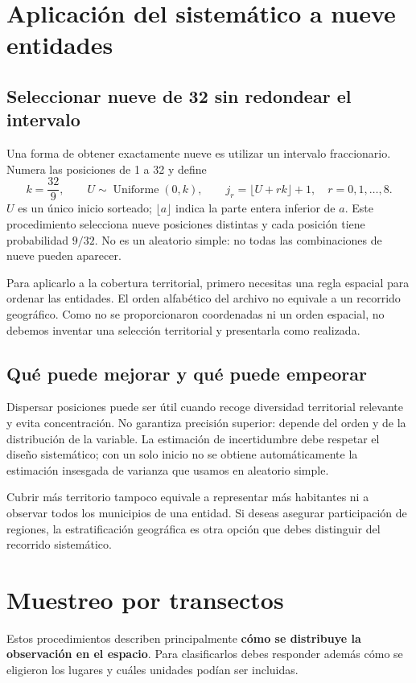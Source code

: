 \documentclass[11pt,letterpaper]{article}
\begin{document}
\section{Aplicación del sistemático a nueve entidades}

\subsection{Seleccionar nueve de 32 sin redondear el intervalo}
Una forma de obtener exactamente nueve es utilizar un intervalo fraccionario. Numera las posiciones de 1 a 32 y define
\[
k=\frac{32}{9},\qquad U\sim\operatorname{Uniforme}(0,k),\qquad
j_r=\lfloor U+rk\rfloor+1,\quad r=0,1,\ldots,8.
\]
$U$ es un único inicio sorteado; $\lfloor a\rfloor$ indica la parte entera inferior de $a$. Este procedimiento selecciona nueve posiciones distintas y cada posición tiene probabilidad $9/32$. No es un aleatorio simple: no todas las combinaciones de nueve pueden aparecer.

Para aplicarlo a la cobertura territorial, primero necesitas una regla espacial para ordenar las entidades. El orden alfabético del archivo no equivale a un recorrido geográfico. Como no se proporcionaron coordenadas ni un orden espacial, no debemos inventar una selección territorial y presentarla como realizada.
\subsection{Qué puede mejorar y qué puede empeorar}
Dispersar posiciones puede ser útil cuando recoge diversidad territorial relevante y evita concentración. No garantiza precisión superior: depende del orden y de la distribución de la variable. La estimación de incertidumbre debe respetar el diseño sistemático; con un solo inicio no se obtiene automáticamente la estimación insesgada de varianza que usamos en aleatorio simple.

Cubrir más territorio tampoco equivale a representar más habitantes ni a observar todos los municipios de una entidad. Si deseas asegurar participación de regiones, la estratificación geográfica es otra opción que debes distinguir del recorrido sistemático.
\clearpage
\section{Muestreo por transectos}
Estos procedimientos describen principalmente \textbf{cómo se distribuye la observación en el espacio}. Para clasificarlos debes responder además cómo se eligieron los lugares y cuáles unidades podían ser incluidas.
\end{document}
